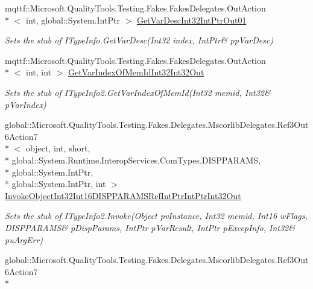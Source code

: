 \begin{DoxyCompactItemize}
mqttf\-::\-Microsoft.\-Quality\-Tools.\-Testing.\-Fakes.\-Fakes\-Delegates.\-Out\-Action\\*
$<$ int, global\-::\-System.\-Int\-Ptr $>$ \hyperlink{class_system_1_1_runtime_1_1_interop_services_1_1_com_types_1_1_fakes_1_1_stub_i_type_info2_a9fe14fa1ca3f6c99d2c846f437d065f0}{Get\-Var\-Desc\-Int32\-Int\-Ptr\-Out01}
\begin{DoxyCompactList}\small\item\em Sets the stub of I\-Type\-Info.\-Get\-Var\-Desc(Int32 index, Int\-Ptr\& pp\-Var\-Desc)\end{DoxyCompactList}\item 
mqttf\-::\-Microsoft.\-Quality\-Tools.\-Testing.\-Fakes.\-Fakes\-Delegates.\-Out\-Action\\*
$<$ int, int $>$ \hyperlink{class_system_1_1_runtime_1_1_interop_services_1_1_com_types_1_1_fakes_1_1_stub_i_type_info2_aa55b6c4cb9f4122b0a578ec6d6bed427}{Get\-Var\-Index\-Of\-Mem\-Id\-Int32\-Int32\-Out}
\begin{DoxyCompactList}\small\item\em Sets the stub of I\-Type\-Info2.\-Get\-Var\-Index\-Of\-Mem\-Id(Int32 memid, Int32\& p\-Var\-Index)\end{DoxyCompactList}\item 
global\-::\-Microsoft.\-Quality\-Tools.\-Testing.\-Fakes.\-Delegates.\-Mscorlib\-Delegates.\-Ref3\-Out6\-Action7\\*
$<$ object, int, short, \\*
global\-::\-System.\-Runtime.\-Interop\-Services.\-Com\-Types.\-D\-I\-S\-P\-P\-A\-R\-A\-M\-S, \\*
global\-::\-System.\-Int\-Ptr, \\*
global\-::\-System.\-Int\-Ptr, int $>$ \hyperlink{class_system_1_1_runtime_1_1_interop_services_1_1_com_types_1_1_fakes_1_1_stub_i_type_info2_a019ffb3957b09c51f94f74b9a7d5a398}{Invoke\-Object\-Int32\-Int16\-D\-I\-S\-P\-P\-A\-R\-A\-M\-S\-Ref\-Int\-Ptr\-Int\-Ptr\-Int32\-Out}
\begin{DoxyCompactList}\small\item\em Sets the stub of I\-Type\-Info2.\-Invoke(Object pv\-Instance, Int32 memid, Int16 w\-Flags, D\-I\-S\-P\-P\-A\-R\-A\-M\-S\& p\-Disp\-Params, Int\-Ptr p\-Var\-Result, Int\-Ptr p\-Excep\-Info, Int32\& pu\-Arg\-Err)\end{DoxyCompactList}\item 
global\-::\-Microsoft.\-Quality\-Tools.\-Testing.\-Fakes.\-Delegates.\-Mscorlib\-Delegates.\-Ref3\-Out6\-Action7\\*

\end{DoxyCompactItemize}
